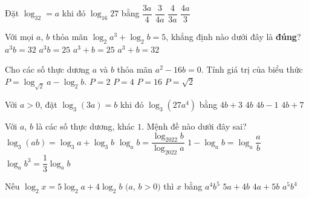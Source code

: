 \begin{ex}%
	[Đề Tham Khảo 2019] Đặt $\log_32=a$ khi đó  $\log_{16}27$ bằng
	 \choice
		{$\dfrac{3a}{4}$} 
		{\True $\dfrac{3}{4a}$} 
		 {$\dfrac{4}{3a}$}
		 {$\dfrac{4a}{3}$}
\end{ex}

\begin{ex}%
	 [MĐ 104 2020-2021 - ĐỢT 1] Với mọi $a$, $b$ thỏa mãn $\log_2a^3+\log_2b=5$, khẳng định nào dưới đây là \textbf{đúng}?
	 \choice
		 {\True $a^3b=32$}
		 {$a^3b=25$}
		{$a^3+b=25$} 
		 {$a^3+b=32$}
\end{ex}

\begin{ex}%
	Cho các số thực dương $a$ và  $b$ thỏa mãn $a^{2}-16b=0$. Tính giá trị của biểu thức $P=\log_{\sqrt{2}}a-\log_{2}b$.
	 \choice
		{$P=2$} 
		 {\True $P=4$}
		 {$P=16$}
		{$P=\sqrt{2}$} 
\end{ex}

\begin{ex}%
	[MĐ 104 2020-2021 - ĐỢT 2] Với  $a>0$, đặt $\log_3(3a)=b$ khi đó $\log_3(27a^4)$ bằng
	\choice 
		{$4b+3$} 
		{$4b$} 
		{\True  $4b-1$}
		 {$4b+7$}
\end{ex}

\begin{ex}%
	Với $a$, $b$ là các số thực dương, khác $1$. Mệnh đề nào dưới đây  sai?
	 \choice
		 {$\log_3(ab)=\log_3a+\log_3b$}
		 {$\log_ab=\dfrac{\log_{2022}b}{\log_{2022}a}$}
		{$1-\log_ab=\log_a\dfrac{a}{b}$} 
		{\True $\log_ab^3=\dfrac{1}{3}\log_ab$} 
\end{ex}

\begin{ex}%
	Nếu $\log _2 x=5 \log _2  a+4 \log _2 b$ $(a$, $b>0)$ thì $x$ bằng
	\choice 
		{$a^4 b^5$} 
		 {$5 a+4 b$}
		{$4  a+5 b$}
		{\True  $a^5 b^4$}
\end{ex}

